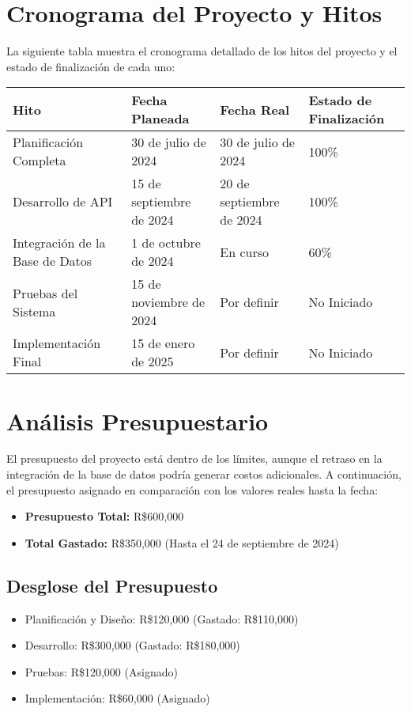 \documentclass[12pt]{article}
\begin{document}
\section*{Cronograma del Proyecto y Hitos}
La siguiente tabla muestra el cronograma detallado de los hitos del proyecto y el estado de finalización de cada uno:

\begin{center}
\begin{tabular}{|m{4cm}|m{3cm}|m{3cm}|m{3cm}|}
\hline
\textbf{Hito} & \textbf{Fecha Planeada} & \textbf{Fecha Real} & \textbf{Estado de Finalización} \\
\hline
Planificación Completa & 30 de julio de 2024 & 30 de julio de 2024 & 100\% \\
\hline
Desarrollo de API & 15 de septiembre de 2024 & 20 de septiembre de 2024 & 100\% \\
\hline
Integración de la Base de Datos & 1 de octubre de 2024 & En curso & 60\% \\
\hline
Pruebas del Sistema & 15 de noviembre de 2024 & Por definir & No Iniciado \\
\hline
Implementación Final & 15 de enero de 2025 & Por definir & No Iniciado \\
\hline
\end{tabular}
\end{center}

\section*{Análisis Presupuestario}
El presupuesto del proyecto está dentro de los límites, aunque el retraso en la integración de la base de datos podría generar costos adicionales. A continuación, el presupuesto asignado en comparación con los valores reales hasta la fecha:

\begin{itemize}
    \item \textbf{Presupuesto Total:} R\$600,000
    \item \textbf{Total Gastado:} R\$350,000 (Hasta el 24 de septiembre de 2024)
\end{itemize}

\subsection*{Desglose del Presupuesto}
\begin{itemize}
    \item Planificación y Diseño: R\$120,000 (Gastado: R\$110,000)
    \item Desarrollo: R\$300,000 (Gastado: R\$180,000)
    \item Pruebas: R\$120,000 (Asignado)
    \item Implementación: R\$60,000 (Asignado)
\end{itemize}
\end{document}
